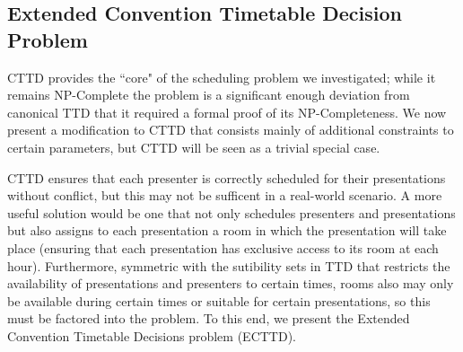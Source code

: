 \documentclass[]{article}
\theoremstyle{definition}
\theoremstyle{remark}
\numberwithin{equation}{section}
\begin{document}
\subsection{Extended Convention Timetable Decision Problem}
CTTD provides the ``core" of the scheduling problem we investigated; while it remains NP-Complete the problem is a significant enough deviation from canonical TTD that it required a formal proof of its NP-Completeness. We now present a modification to CTTD that consists mainly of additional constraints to certain parameters, but CTTD will be seen as a trivial special case.

CTTD ensures that each presenter is correctly scheduled for their presentations without conflict, but this may not be sufficent in a real-world scenario. A more useful solution would be one that not only schedules presenters and presentations but also assigns to each presentation a room in which the presentation will take place (ensuring that each presentation has exclusive access to its room at each hour). Furthermore, symmetric with the sutibility sets in TTD that restricts the availability of presentations and presenters to certain times, rooms also may only be available during certain times or suitable for certain presentations, so this must be factored into the problem. To this end, we present the Extended Convention Timetable Decisions problem (ECTTD).
\end{document}
